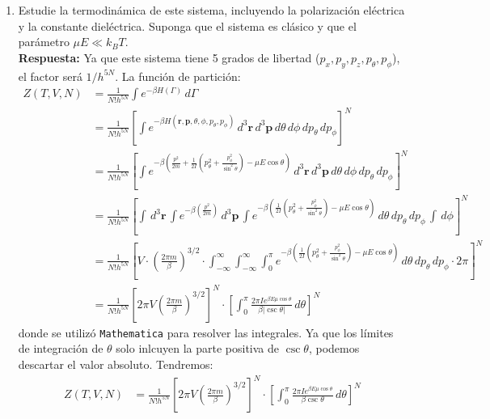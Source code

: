 \documentclass[]{article}
\numberwithin{equation}{section}
\newcommand{\0}{\textcolor{gray}{0}}
\newcommand{\rv}{\mathbf{r}}
\newcommand{\pv}{\mathbf{p}}
\begin{document}
\begin{enumerate}
	\item[(a)] Estudie la termodinámica de este sistema, incluyendo la polarización eléctrica y la constante dieléctrica. Suponga que el sistema es clásico y que el parámetro $\mu E \ll k_B T$.
	\\
	
	\textbf{Respuesta:} Ya que este sistema tiene 5 grados de libertad ($p_{x}, p_{y}, p_{z}, p_{\theta}, p_{\phi}$), el factor será $1/h^{5N}$. La función de partición:
	\begin{align*}
		Z(T,V,N) &= \frac{1}{N! h^{5N}}\int e^{-\beta H(\Gamma)} \, d\Gamma \nonumber\\
		&= \frac{1}{N! h^{5N}} \left[\int e^{-\beta H(\rv,\pv,\theta,\phi,p_\theta,p_\phi)} \, d^3\rv \, d^3\pv \, d\theta \, d\phi \, dp_\theta \, dp_\phi \right]^N \\
		&= \frac{1}{N! h^{5N}} \left[\int e^{-\beta \left(\frac{p^2}{2 m} + \frac{1}{2 I}\left(p_\theta^2 + \frac{p_\phi^2}{\sin^2\theta}\right) - \mu E \cos\theta\right)} \, d^3\rv \, d^3\pv \, d\theta \, d\phi \, dp_\theta \, dp_\phi \right]^N\\
		&= \frac{1}{N! h^{5N}} \left[\int \, d^3\rv \, \int e^{-\beta \left(\frac{p^2}{2 m}\right)} \, d^3\pv \, \int e^{-\beta \left(\frac{1}{2 I}\left(p_\theta^2 + \frac{p_\phi^2}{\sin^2\theta}\right) - \mu E \cos\theta \right)} \, d\theta \, dp_\theta \, dp_\phi \, \int \, d\phi \right]^N\\
		&= \frac{1}{N! h^{5N}} \left[V \cdot \left(\frac{2\pi m}{\beta}\right)^{3/2} \cdot \int_{-\infty}^{\infty} \int_{-\infty}^{\infty} \int_{0}^{\pi} e^{-\beta \left(\frac{1}{2 I}\left(p_\theta^2 + \frac{p_\phi^2}{\sin^2\theta}\right) - \mu E \cos\theta \right)} \, d\theta \, dp_\theta \, dp_\phi \cdot 2\pi \right]^N\\
		&= \frac{1}{N! h^{5N}} \left[2\pi V\left(\frac{2\pi m}{\beta}\right)^{3/2}\right]^{N} \cdot \left[ \int_{0}^{\pi} \frac{2 \pi I e^{\beta E \mu  \cos \theta}}{\beta  | \csc \theta| } \, d\theta\right]^N
	\end{align*}
	donde se utilizó \texttt{Mathematica} para resolver las integrales. Ya que los límites de integración de $\theta$ solo inlcuyen la parte positiva de $\csc\theta$, podemos descartar el valor absoluto. Tendremos:
	\begin{align}
		Z(T,V,N) &= \frac{1}{N! h^{5N}} \left[2\pi V\left(\frac{2\pi m}{\beta}\right)^{3/2}\right]^{N} \cdot \left[ \int_{0}^{\pi} \frac{2 \pi I e^{\beta E \mu  \cos \theta}}{\beta  \csc \theta } \, d\theta\right]^N\nonumber\\

\end{align}
\end{enumerate}
\end{document}
